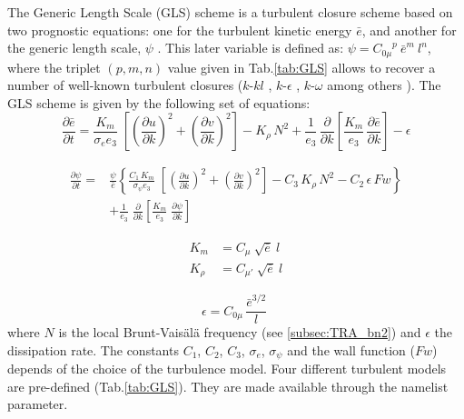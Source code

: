 \documentclass[../main/NEMO_manual]{subfiles}
\begin{document}

The Generic Length Scale (GLS) scheme is a turbulent closure scheme based on two prognostic equations:
one for the turbulent kinetic energy $\bar {e}$, and another for the generic length scale,
$\psi$ \citep{Umlauf_Burchard_JMS03, Umlauf_Burchard_CSR05}.
This later variable is defined as: $\psi = {C_{0\mu}}^{p} \ {\bar{e}}^{m} \ l^{n}$, 
where the triplet $(p, m, n)$ value given in Tab.\autoref{tab:GLS} allows to recover a number of
well-known turbulent closures ($k$-$kl$ \citep{Mellor_Yamada_1982}, $k$-$\epsilon$ \citep{Rodi_1987},
$k$-$\omega$ \citep{Wilcox_1988} among others \citep{Umlauf_Burchard_JMS03,Kantha_Carniel_CSR05}). 
The GLS scheme is given by the following set of equations:
\begin{equation}
  \label{eq:zdfgls_e}
  \frac{\partial \bar{e}}{\partial t} =
  \frac{K_m}{\sigma_e e_3 }\;\left[ {\left( \frac{\partial u}{\partial k} \right)^2
      +\left( \frac{\partial v}{\partial k} \right)^2} \right]
  -K_\rho \,N^2
  +\frac{1}{e_3}\,\frac{\partial}{\partial k} \left[ \frac{K_m}{e_3}\,\frac{\partial \bar{e}}{\partial k} \right]
  - \epsilon
\end{equation}

\[
  \begin{split}
    \frac{\partial \psi}{\partial t} =& \frac{\psi}{\bar{e}} \left\{
      \frac{C_1\,K_m}{\sigma_{\psi} {e_3}}\;\left[ {\left( \frac{\partial u}{\partial k} \right)^2
          +\left( \frac{\partial v}{\partial k} \right)^2} \right]
      - C_3 \,K_\rho\,N^2   - C_2 \,\epsilon \,Fw   \right\}             \\
    &+\frac{1}{e_3}  \;\frac{\partial }{\partial k}\left[ {\frac{K_m}{e_3 }
        \;\frac{\partial \psi}{\partial k}} \right]\;
  \end{split}
\]

\[
  \begin{split}
    K_m    &= C_{\mu} \ \sqrt {\bar{e}} \ l         \\
    K_\rho &= C_{\mu'}\ \sqrt {\bar{e}} \ l
  \end{split}
\]

\[
  {\epsilon} = C_{0\mu} \,\frac{\bar {e}^{3/2}}{l} \;
\]
where $N$ is the local Brunt-Vais\"{a}l\"{a} frequency (see \autoref{subsec:TRA_bn2}) and
$\epsilon$ the dissipation rate. 
The constants $C_1$, $C_2$, $C_3$, ${\sigma_e}$, ${\sigma_{\psi}}$ and the wall function ($Fw$) depends of
the choice of the turbulence model.
Four different turbulent models are pre-defined (Tab.\autoref{tab:GLS}).
They are made available through the  namelist parameter. 
\end{document}
